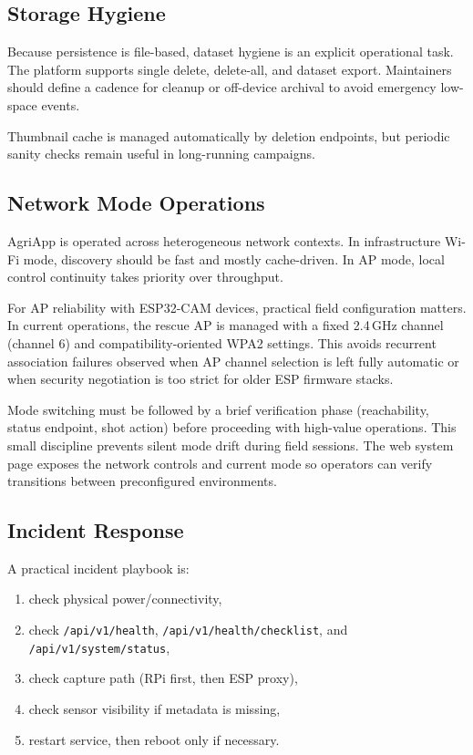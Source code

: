 \subsection{Storage Hygiene}
Because persistence is file-based, dataset hygiene is an explicit operational task. The platform supports single delete, delete-all, and dataset export. Maintainers should define a cadence for cleanup or off-device archival to avoid emergency low-space events.

Thumbnail cache is managed automatically by deletion endpoints, but periodic sanity checks remain useful in long-running campaigns.

\subsection{Network Mode Operations}
AgriApp is operated across heterogeneous network contexts. In infrastructure Wi-Fi mode, discovery should be fast and mostly cache-driven. In AP mode, local control continuity takes priority over throughput.

For AP reliability with ESP32-CAM devices, practical field configuration matters. In current operations, the rescue AP is managed with a fixed 2.4\,GHz channel (channel 6) and compatibility-oriented WPA2 settings. This avoids recurrent association failures observed when AP channel selection is left fully automatic or when security negotiation is too strict for older ESP firmware stacks.

Mode switching must be followed by a brief verification phase (reachability, status endpoint, shot action) before proceeding with high-value operations. This small discipline prevents silent mode drift during field sessions.
The web system page exposes the network controls and current mode so operators can verify transitions between preconfigured environments.

\subsection{Incident Response}
A practical incident playbook is:
\begin{enumerate}
  \item check physical power/connectivity,
  \item check \texttt{/api/v1/health}, \texttt{/api/v1/health/checklist}, and \texttt{/api/v1/system/status},
  \item check capture path (RPi first, then ESP proxy),
  \item check sensor visibility if metadata is missing,
  \item restart service, then reboot only if necessary.
\end{enumerate}

